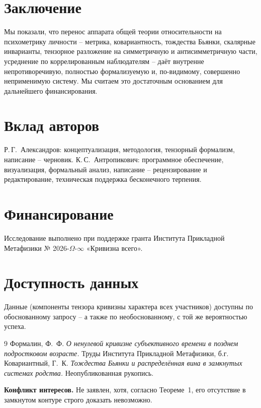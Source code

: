 \documentclass[11pt,a4paper]{article}
\begin{document}
\section{Заключение}

Мы показали, что перенос аппарата общей теории относительности на психометрику личности -- метрика, ковариантность, тождества Бьянки, скалярные инварианты, тензорное разложение на симметричную и антисимметричную части, усреднение по коррелированным наблюдателям -- даёт внутренне непротиворечивую, полностью формализуемую и, по-видимому, совершенно неприменимую систему. Мы считаем это достаточным основанием для дальнейшего финансирования.

\section*{Вклад авторов}
Р.\,Г.~Александров: концептуализация, методология, тензорный формализм, написание -- черновик. К.\,С.~Антропикович: программное обеспечение, визуализация, формальный анализ, написание -- рецензирование и редактирование, техническая поддержка бесконечного терпения.

\section*{Финансирование}
Исследование выполнено при поддержке гранта Института Прикладной Метафизики № 2026-$\Omega$-$\infty$ «Кривизна всего».

\section*{Доступность данных}
Данные (компоненты тензора кривизны характера всех участников) доступны по обоснованному запросу -- а также по необоснованному, с той же вероятностью успеха.

\begin{thebibliography}{9}
 Формалин, Ф.~Ф. \textit{О ненулевой кривизне субъективного времени в позднем подростковом возрасте.} Труды Института Прикладной Метафизики, б.г.
 Ковариантный, Г.~К. \textit{Тождества Бьянки и распределённая вина в замкнутых системах родства.} Неопубликованная рукопись.
\end{thebibliography}

\noindent\textbf{Конфликт интересов.} Не заявлен, хотя, согласно Теореме~1, его отсутствие в замкнутом контуре строго доказать невозможно.
\end{document}
